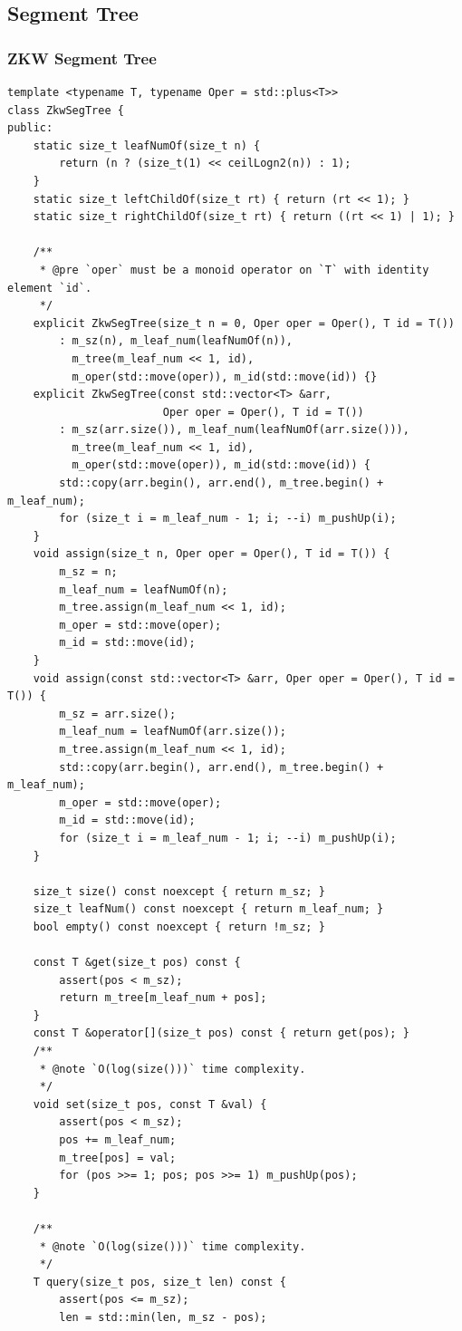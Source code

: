 \documentclass[UTF8]{article}
\begin{document}
\subsection{Segment Tree}
\subsubsection{ZKW Segment Tree}
\begin{verbatim}
template <typename T, typename Oper = std::plus<T>>
class ZkwSegTree {
public:
	static size_t leafNumOf(size_t n) {
		return (n ? (size_t(1) << ceilLogn2(n)) : 1);
	}
	static size_t leftChildOf(size_t rt) { return (rt << 1); }
	static size_t rightChildOf(size_t rt) { return ((rt << 1) | 1); }

	/**
	 * @pre `oper` must be a monoid operator on `T` with identity element `id`.
	 */
	explicit ZkwSegTree(size_t n = 0, Oper oper = Oper(), T id = T())
		: m_sz(n), m_leaf_num(leafNumOf(n)),
		  m_tree(m_leaf_num << 1, id),
		  m_oper(std::move(oper)), m_id(std::move(id)) {}
	explicit ZkwSegTree(const std::vector<T> &arr,
						Oper oper = Oper(), T id = T())
		: m_sz(arr.size()), m_leaf_num(leafNumOf(arr.size())),
		  m_tree(m_leaf_num << 1, id),
		  m_oper(std::move(oper)), m_id(std::move(id)) {
		std::copy(arr.begin(), arr.end(), m_tree.begin() + m_leaf_num);
		for (size_t i = m_leaf_num - 1; i; --i) m_pushUp(i);
	}
	void assign(size_t n, Oper oper = Oper(), T id = T()) {
		m_sz = n;
		m_leaf_num = leafNumOf(n);
		m_tree.assign(m_leaf_num << 1, id);
		m_oper = std::move(oper);
		m_id = std::move(id);
	}
	void assign(const std::vector<T> &arr, Oper oper = Oper(), T id = T()) {
		m_sz = arr.size();
		m_leaf_num = leafNumOf(arr.size());
		m_tree.assign(m_leaf_num << 1, id);
		std::copy(arr.begin(), arr.end(), m_tree.begin() + m_leaf_num);
		m_oper = std::move(oper);
		m_id = std::move(id);
		for (size_t i = m_leaf_num - 1; i; --i) m_pushUp(i);
	}

	size_t size() const noexcept { return m_sz; }
	size_t leafNum() const noexcept { return m_leaf_num; }
	bool empty() const noexcept { return !m_sz; }

	const T &get(size_t pos) const {
		assert(pos < m_sz);
		return m_tree[m_leaf_num + pos];
	}
	const T &operator[](size_t pos) const { return get(pos); }
	/**
	 * @note `O(log(size()))` time complexity.
	 */
	void set(size_t pos, const T &val) {
		assert(pos < m_sz);
		pos += m_leaf_num;
		m_tree[pos] = val;
		for (pos >>= 1; pos; pos >>= 1) m_pushUp(pos);
	}

	/**
	 * @note `O(log(size()))` time complexity.
	 */
	T query(size_t pos, size_t len) const {
		assert(pos <= m_sz);
		len = std::min(len, m_sz - pos);


\end{verbatim}
\end{document}
